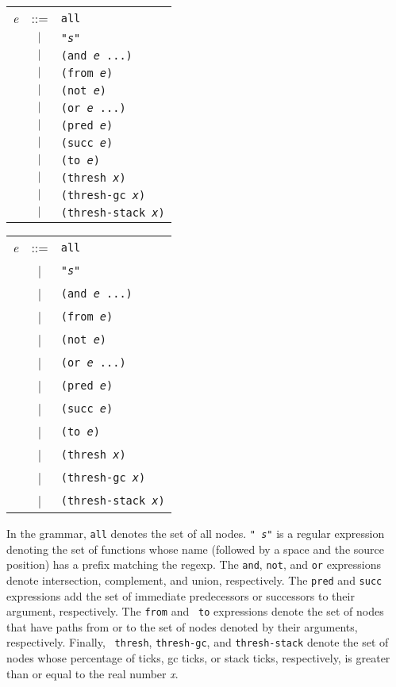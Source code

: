\begin{latexonly}
\begin{center}
\begin{tabular}{lcl}
{\it e} & ::= & {\tt all} \\
& $\ |\ $ & {\tt "{\it s}"} \\
& $\ |\ $ & {\tt (and {\it e} ...)} \\
& $\ |\ $ & {\tt (from {\it e})} \\
& $\ |\ $ & {\tt (not {\it e})} \\
& $\ |\ $ & {\tt (or {\it e} ...)} \\
& $\ |\ $ & {\tt (pred {\it e})} \\
& $\ |\ $ & {\tt (succ {\it e})} \\
& $\ |\ $ & {\tt (to {\it e})} \\
& $\ |\ $ & {\tt (thresh {\it x})} \\
& $\ |\ $ & {\tt (thresh-gc {\it x})} \\
& $\ |\ $ & {\tt (thresh-stack {\it x})} \\
\end{tabular}
\end{center}
\end{latexonly}
\begin{htmlonly}
\begin{center}
\begin{tabular}{lcl}
{\it e} & ::= & {\tt all} \\
& | & {\tt "{\it s}"} \\
& | & {\tt (and {\it e} ...)} \\
& | & {\tt (from {\it e})} \\
& | & {\tt (not {\it e})} \\
& | & {\tt (or {\it e} ...)} \\
& | & {\tt (pred {\it e})} \\
& | & {\tt (succ {\it e})} \\
& | & {\tt (to {\it e})} \\
& | & {\tt (thresh {\it x})} \\
& | & {\tt (thresh-gc {\it x})} \\
& | & {\tt (thresh-stack {\it x})} \\
\end{tabular}
\end{center}
\end{htmlonly}

In the grammar, {\tt all} denotes the set of all nodes.  {\tt "{\it
s}"} is a regular expression denoting the set of functions whose name
(followed by a space and the source position) has a prefix matching
the regexp.  The {\tt and}, {\tt not}, and {\tt or} expressions denote
intersection, complement, and union, respectively.  The {\tt pred} and
{\tt succ} expressions add the set of immediate predecessors or
successors to their argument, respectively.  The {\tt from} and {\tt
to} expressions denote the set of nodes that have paths from or to the
set of nodes denoted by their arguments, respectively.  Finally, {\tt
thresh}, {\tt thresh-gc}, and {\tt thresh-stack} denote the set of
nodes whose percentage of ticks, gc ticks, or stack ticks,
respectively, is greater than or equal to the real number {\it x}.

